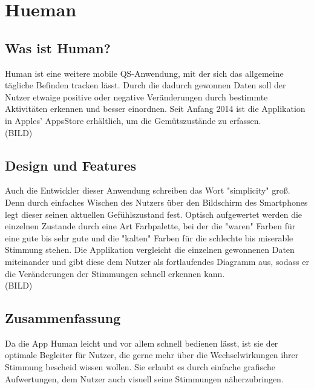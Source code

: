 \section{Hueman}
\label{ch:Apps:sec:Hueman}

\subsection{Was ist Human?}
\label{ch:Apps:sec:Moves:subsec:WIH}

Human ist eine weitere mobile QS-Anwendung, mit der sich das allgemeine tägliche Befinden tracken lässt. 
Durch die dadurch gewonnen Daten soll der Nutzer etwaige positive oder negative Veränderungen durch bestimmte Aktivitäten erkennen und besser einordnen.
Seit Anfang 2014 ist die Applikation in Apples' AppsStore erhältlich, um die Gemütszustände zu erfassen.
\\
(BILD)

\subsection{Design und Features}
\label{ch:Apps:sec:Moves:subsec:DuFe}

Auch die Entwickler dieser Anwendung schreiben das Wort "simplicity" groß. 
Denn durch einfaches Wischen des Nutzers über den Bildschirm des Smartphones legt dieser seinen aktuellen Gefühlszustand fest.
Optisch aufgewertet werden die einzelnen Zustande durch eine Art Farbpalette, bei der die "waren" Farben für eine gute bis sehr gute und die "kalten" Farben für die schlechte bis miserable Stimmung stehen.
Die Applikation vergleicht die einzelnen gewonnenen Daten miteinander und gibt diese dem Nutzer als fortlaufendes Diagramm aus, sodass er die Veränderungen der Stimmungen schnell erkennen kann.
\\
(BILD)

\subsection{Zusammenfassung}
\label{ch:Apps:sec:Moves:subsec:Verdict}

Da die App Human leicht und vor allem schnell bedienen lässt, ist sie der optimale Begleiter für Nutzer, die gerne mehr über die Wechselwirkungen ihrer Stimmung bescheid wissen wollen.
Sie erlaubt es durch einfache grafische Aufwertungen, dem Nutzer auch visuell seine Stimmungen näherzubringen.  


